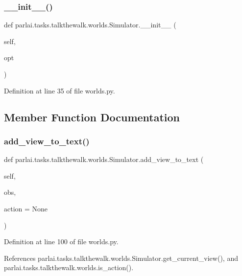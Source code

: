 \subsubsection{\texorpdfstring{\+\_\+\+\_\+init\+\_\+\+\_\+()}{\_\_init\_\_()}}
{\footnotesize\ttfamily def parlai.\+tasks.\+talkthewalk.\+worlds.\+Simulator.\+\_\+\+\_\+init\+\_\+\+\_\+ (\begin{DoxyParamCaption}\item[{}]{self,  }\item[{}]{opt }\end{DoxyParamCaption})}



Definition at line 35 of file worlds.\+py.



\subsection{Member Function Documentation}
\mbox{\label{classparlai_1_1tasks_1_1talkthewalk_1_1worlds_1_1Simulator_a7f1a6089e2650f3787e5493931a45570}} 
\subsubsection{\texorpdfstring{add\+\_\+view\+\_\+to\+\_\+text()}{add\_view\_to\_text()}}
{\footnotesize\ttfamily def parlai.\+tasks.\+talkthewalk.\+worlds.\+Simulator.\+add\+\_\+view\+\_\+to\+\_\+text (\begin{DoxyParamCaption}\item[{}]{self,  }\item[{}]{obs,  }\item[{}]{action = {\ttfamily None} }\end{DoxyParamCaption})}



Definition at line 100 of file worlds.\+py.



References parlai.\+tasks.\+talkthewalk.\+worlds.\+Simulator.\+get\+\_\+current\+\_\+view(), and parlai.\+tasks.\+talkthewalk.\+worlds.\+is\+\_\+action().



